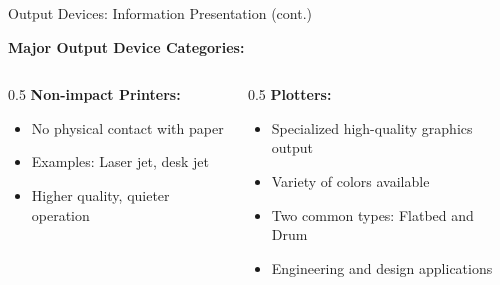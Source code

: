 \documentclass[aspectratio=169]{beamer}
\begin{document}
\begin{frame}{Output Devices: Information Presentation (cont.)}
     
    \textbf{Major Output Device Categories:}
    
    \begin{columns}
        \begin{column}{0.5\textwidth}  
            \textbf{Non-impact Printers:}
            \begin{itemize}
                \item No physical contact with paper
                \item Examples: Laser jet, desk jet
                \item Higher quality, quieter operation
            \end{itemize}
        \end{column}
        \begin{column}{0.5\textwidth}
            \textbf{Plotters:}
            \begin{itemize}
                \item Specialized high-quality graphics output
                \item Variety of colors available
                \item Two common types: Flatbed and Drum
                \item Engineering and design applications
            \end{itemize} 
             
        \end{column}
    \end{columns}
\end{frame}
\end{document}

